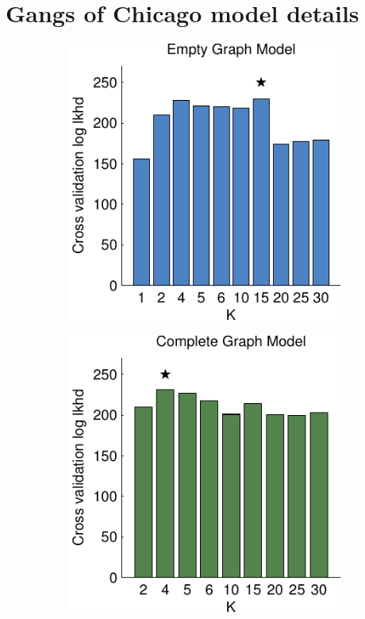 \section{Gangs of Chicago model details}
\begin{figure}[!t]
\begin{subfigure}[T]{.24\linewidth}
\begin{center}
\includegraphics[width=\linewidth]{figures/ch2/icpsr_xv_empty}
\end{center}
\end{subfigure}
\begin{subfigure}[T]{.24\linewidth}
\begin{center}
\includegraphics[width=\linewidth]{figures/ch2/icpsr_xv_complete}

\end{center}
\end{subfigure}
\end{figure}
